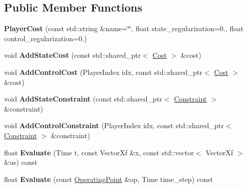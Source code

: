 \subsection*{Public Member Functions}
\begin{DoxyCompactItemize}
\item 
{\bfseries Player\+Cost} (const std\+::string \&name=\char`\"{}\char`\"{}, float state\+\_\+regularization=0., float control\+\_\+regularization=0.)\hypertarget{classilqgames_1_1_player_cost_a271f96af8eeac9138b0832239ca62437}{}\label{classilqgames_1_1_player_cost_a271f96af8eeac9138b0832239ca62437}

\item 
void {\bfseries Add\+State\+Cost} (const std\+::shared\+\_\+ptr$<$ \hyperlink{classilqgames_1_1_cost}{Cost} $>$ \&cost)\hypertarget{classilqgames_1_1_player_cost_a3135d5f4c7722edc1ae385e0ecafcc87}{}\label{classilqgames_1_1_player_cost_a3135d5f4c7722edc1ae385e0ecafcc87}

\item 
void {\bfseries Add\+Control\+Cost} (Player\+Index idx, const std\+::shared\+\_\+ptr$<$ \hyperlink{classilqgames_1_1_cost}{Cost} $>$ \&cost)\hypertarget{classilqgames_1_1_player_cost_aba4df0e6414aba024c86bf77fe57f819}{}\label{classilqgames_1_1_player_cost_aba4df0e6414aba024c86bf77fe57f819}

\item 
void {\bfseries Add\+State\+Constraint} (const std\+::shared\+\_\+ptr$<$ \hyperlink{classilqgames_1_1_constraint}{Constraint} $>$ \&constraint)\hypertarget{classilqgames_1_1_player_cost_a9c1a21f669ab3f937c3be8a49bf7b5b3}{}\label{classilqgames_1_1_player_cost_a9c1a21f669ab3f937c3be8a49bf7b5b3}

\item 
void {\bfseries Add\+Control\+Constraint} (Player\+Index idx, const std\+::shared\+\_\+ptr$<$ \hyperlink{classilqgames_1_1_constraint}{Constraint} $>$ \&constraint)\hypertarget{classilqgames_1_1_player_cost_a9df6549112ab9b03bd639b4955b700da}{}\label{classilqgames_1_1_player_cost_a9df6549112ab9b03bd639b4955b700da}

\item 
float {\bfseries Evaluate} (Time t, const Vector\+Xf \&x, const std\+::vector$<$ Vector\+Xf $>$ \&us) const \hypertarget{classilqgames_1_1_player_cost_ac1ad99a1822d97a53d084fd9da162cb1}{}\label{classilqgames_1_1_player_cost_ac1ad99a1822d97a53d084fd9da162cb1}

\item 
float {\bfseries Evaluate} (const \hyperlink{structilqgames_1_1_operating_point}{Operating\+Point} \&op, Time time\+\_\+step) const \hypertarget{classilqgames_1_1_player_cost_a8c7fc17986dfb478df17cf9f8da85926}{}\label{classilqgames_1_1_player_cost_a8c7fc17986dfb478df17cf9f8da85926}


\end{DoxyCompactItemize}
